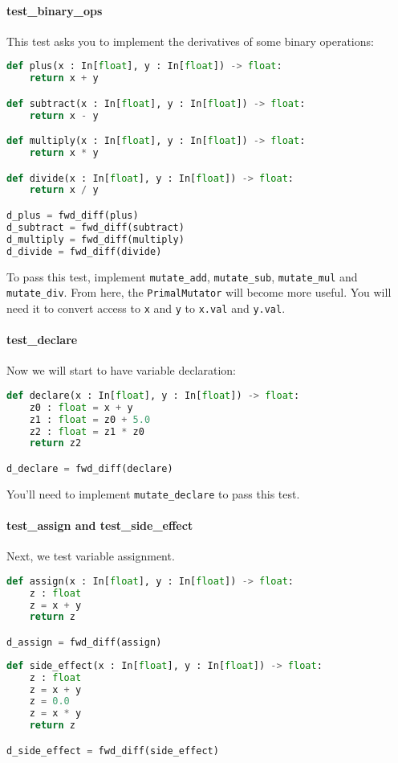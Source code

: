 \paragraph{test_binary_ops} This test asks you to implement the derivatives of some binary operations:
\begin{lstlisting}[language=Python]
def plus(x : In[float], y : In[float]) -> float:
    return x + y

def subtract(x : In[float], y : In[float]) -> float:
    return x - y

def multiply(x : In[float], y : In[float]) -> float:
    return x * y

def divide(x : In[float], y : In[float]) -> float:
    return x / y

d_plus = fwd_diff(plus)
d_subtract = fwd_diff(subtract)
d_multiply = fwd_diff(multiply)
d_divide = fwd_diff(divide)
\end{lstlisting}
To pass this test, implement \lstinline{mutate_add}, \lstinline{mutate_sub}, \lstinline{mutate_mul} and \lstinline{mutate_div}. From here, the \lstinline{PrimalMutator} will become more useful. You will need it to convert access to \lstinline{x} and \lstinline{y} to \lstinline{x.val} and \lstinline{y.val}.

\paragraph{test_declare} Now we will start to have variable declaration:
\begin{lstlisting}[language=Python]
def declare(x : In[float], y : In[float]) -> float:
    z0 : float = x + y
    z1 : float = z0 + 5.0
    z2 : float = z1 * z0
    return z2

d_declare = fwd_diff(declare)
\end{lstlisting}
You'll need to implement \lstinline{mutate_declare} to pass this test.

\paragraph{test_assign and test_side_effect} Next, we test variable assignment.
\begin{lstlisting}[language=Python]
def assign(x : In[float], y : In[float]) -> float:
    z : float
    z = x + y
    return z

d_assign = fwd_diff(assign)
\end{lstlisting}

\begin{lstlisting}[language=Python]
def side_effect(x : In[float], y : In[float]) -> float:
    z : float
    z = x + y
    z = 0.0
    z = x * y
    return z

d_side_effect = fwd_diff(side_effect)
\end{lstlisting}

